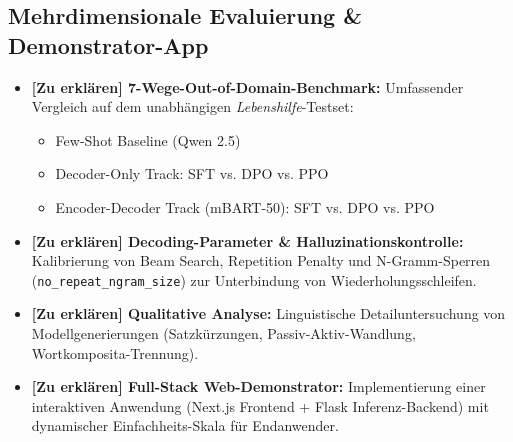 \subsection{Mehrdimensionale Evaluierung \& Demonstrator-App}
\label{sec:mehrdimensionale_evaluierung}
\begin{tcolorbox}[colback=red!5!white,colframe=red!75!black,title=\textbf{Zu erklären in diesem Abschnitt:},sharp corners,boxrule=0.8pt]
\color{red!80!black}
\begin{itemize}
    \item \textbf{[Zu erklären] 7-Wege-Out-of-Domain-Benchmark:} Umfassender Vergleich auf dem unabhängigen \textit{Lebenshilfe}-Testset:
    \begin{itemize}
        \item Few-Shot Baseline (Qwen 2.5)
        \item Decoder-Only Track: SFT vs. DPO vs. PPO
        \item Encoder-Decoder Track (mBART-50): SFT vs. DPO vs. PPO
    \end{itemize}
    \item \textbf{[Zu erklären] Decoding-Parameter \& Halluzinationskontrolle:} Kalibrierung von Beam Search, Repetition Penalty und N-Gramm-Sperren (\texttt{no\_repeat\_ngram\_size}) zur Unterbindung von Wiederholungsschleifen.
    \item \textbf{[Zu erklären] Qualitative Analyse:} Linguistische Detailuntersuchung von Modellgenerierungen (Satzkürzungen, Passiv-Aktiv-Wandlung, Wortkomposita-Trennung).
    \item \textbf{[Zu erklären] Full-Stack Web-Demonstrator:} Implementierung einer interaktiven Anwendung (Next.js Frontend + Flask Inferenz-Backend) mit dynamischer Einfachheits-Skala für Endanwender.
\end{itemize}
\end{tcolorbox}
